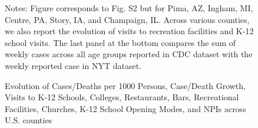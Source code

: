 \documentclass[9pt,twoside,lineno]{pnas-new}
\theoremstyle{definition}
\begin{document}
\begin{figure}[!ht]
{\begin{minipage}{\linewidth}
\begin{tabular}{c|c|c|c|c}
    \end{tabular} 
  \end{minipage}}  
   {\scriptsize
\begin{flushleft}
Notes: Figure corresponds to Fig. S2 but for Pima, AZ, Ingham, MI, Centre, PA, Story, IA, and Champaign, IL. Across various counties, we also report the evolution of visits to recreation facilities and K-12 school visits. The last panel at the bottom compares the sum of  weekly cases across all age groups reported in CDC dataset with the weekly reported case in NYT dataset.
\end{flushleft}  } 
 \end{figure}




\begin{figure}[!ht] 
\caption{Evolution of Cases/Deaths per 1000 Persons,  Case/Death Growth, Visits to K-12 Schools, Colleges, Restaurants, Bars, Recreational Facilities,   Churches, K-12 School Opening Modes, and NPIs  across U.S. counties \label{fig:evolution-SI}}
\end{figure}
\end{document}
